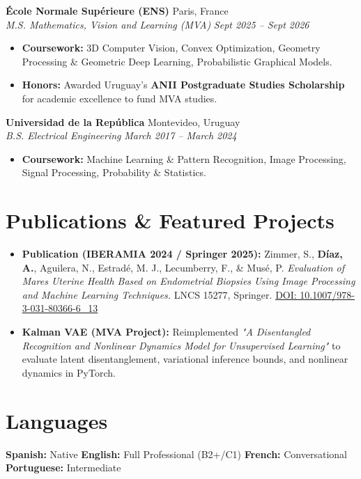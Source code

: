 \documentclass[10pt, a4paper]{article}
\newcommand{\entryheader}[4]{
    \noindent \textbf{#1} \hfill #2 \\
    \textit{#3} \hfill \textit{#4} \vspace{0pt}
}
\begin{document}
\entryheader{École Normale Supérieure (ENS)}{Paris, France}{M.S. Mathematics, Vision and Learning (MVA)}{Sept 2025 -- Sept 2026}
\begin{itemize}
    \item \textbf{Coursework:} 3D Computer Vision, Convex Optimization, Geometry Processing \& Geometric Deep Learning, Probabilistic Graphical Models.
    \item \textbf{Honors:} Awarded Uruguay's \textbf{ANII Postgraduate Studies Scholarship} for academic excellence to fund MVA studies.
\end{itemize}
\vspace{3pt}

\entryheader{Universidad de la República}{Montevideo, Uruguay}{B.S. Electrical Engineering}{March 2017 -- March 2024}
\begin{itemize}
    \item \textbf{Coursework:} Machine Learning \& Pattern Recognition, Image Processing, Signal Processing, Probability \& Statistics.
\end{itemize}

\section{Publications \& Featured Projects}
\begin{itemize}
    \item \textbf{Publication (IBERAMIA 2024 / Springer 2025):} Zimmer, S., \textbf{Díaz, A.}, Aguilera, N., Estradé, M. J., Lecumberry, F., \& Musé, P. \textit{Evaluation of Mares Uterine Health Based on Endometrial Biopsies Using Image Processing and Machine Learning Techniques.} LNCS 15277, Springer. \href{https://doi.org/10.1007/978-3-031-80366-6_13}{DOI: 10.1007/978-3-031-80366-6\_13}
    \item \textbf{Kalman VAE (MVA Project):} Reimplemented \textit{"A Disentangled Recognition and Nonlinear Dynamics Model for Unsupervised Learning"} to evaluate latent disentanglement, variational inference bounds, and nonlinear dynamics in PyTorch.
\end{itemize}

\section{Languages}
\textbf{Spanish:} Native \quad \textbar{} \quad \textbf{English:} Full Professional (B2+/C1) \quad \textbar{} \quad \textbf{French:} Conversational \quad \textbar{} \quad \textbf{Portuguese:} Intermediate
\end{document}
